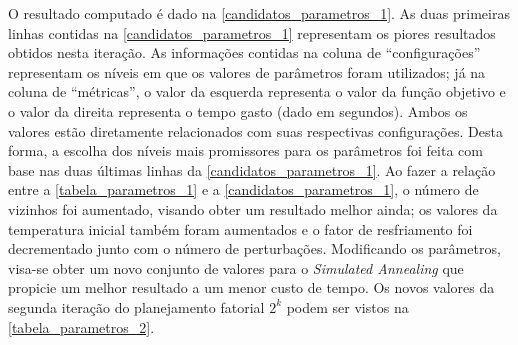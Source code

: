 \documentclass[
	12pt,				%
	twoside,			%
	a4paper,			%
	english,			%
	french,				%
	spanish,			%
	brazil				%
	]{abntex2}
\begin{document}
O resultado computado é dado na \autoref{candidatos_parametros_1}. As
duas primeiras linhas contidas na \autoref{candidatos_parametros_1}
representam os piores resultados obtidos nesta iteração. As informações
contidas na coluna de ``configurações'' representam os níveis em que os
valores de parâmetros foram utilizados; já na coluna de ``métricas'', o
valor da esquerda representa o valor da função objetivo e o valor da
direita representa o tempo gasto (dado em segundos). Ambos os valores
estão diretamente relacionados com suas respectivas configurações. Desta
forma, a escolha dos níveis mais promissores para os parâmetros foi
feita com base nas duas últimas linhas da
\autoref{candidatos_parametros_1}. Ao fazer a relação entre a
\autoref{tabela_parametros_1} e a \autoref{candidatos_parametros_1}, o
número de vizinhos foi aumentado, visando obter um resultado melhor
ainda; os valores da temperatura inicial também foram aumentados e o
fator de resfriamento foi decrementado junto com o número de
perturbações. Modificando os parâmetros, visa-se obter um novo conjunto
de valores para o \emph{Simulated Annealing} que propicie um melhor
resultado a um menor custo de tempo. Os novos valores da segunda
iteração do planejamento fatorial \(2^{k}\) podem ser vistos na
\autoref{tabela_parametros_2}.

\begin{table}[ht]
    \centering
    \caption{Níveis propostos para os parâmetros do \textit{Simulated Annealing} na segunda iteração.}
    \label{tabela_parametros_2}
\end{table}
\end{document}
